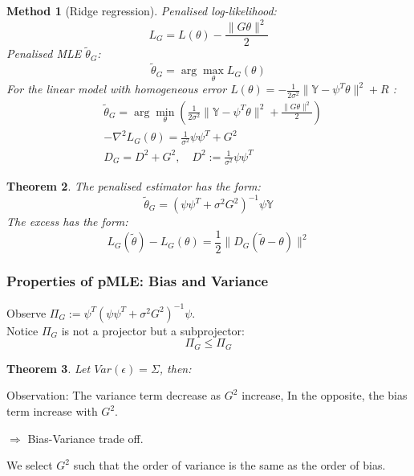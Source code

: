 \documentclass[a4paper,12pt, oneside, fleqn]{book}
\newtheorem{theorem}{Theorem}[section]
\newtheorem{method}[theorem]{Method}
\theoremstyle{definition}
\theoremstyle{remark}
\begin{document}
\begin{method}[Ridge regression]
Penalised log-likelihood:
\begin{equation*}
	L_G = L(\theta) - \frac{\|G\theta\|^2}{2} 
\end{equation*}
Penalised MLE $\tilde{\theta}_G$:
\begin{equation*}
	\tilde{\theta}_G = \arg \max_\theta L_G(\theta)
\end{equation*}	
For the linear model with homogeneous error $L(\theta) = -\frac{1}{2\sigma^2} \| \mathbb{Y} - \psi^T \theta\|^2 + R$ :
\begin{align*}
	&\tilde{\theta}_G = \arg \min_\theta(\frac{1}{2\sigma^2} \| \mathbb{Y} - \psi^T \theta\|^2 + \frac{\|G\theta\|^2}{2} )\\
	&-\nabla^2 L_G(\theta) = \frac{1}{\sigma^2} \psi \psi^T + G^2\\
	&D_G = D^2 + G^2, \quad D^2 := \frac{1}{\sigma^2} \psi \psi^T
\end{align*}
\end{method}



\begin{theorem}
	The penalised estimator has the form:
	\begin{equation*}
		\tilde{\theta}_G = (\psi \psi^T + \sigma^2 G^2)^{-1} \psi \mathbb{Y}
	\end{equation*}
	The excess has the form:
	\begin{equation*}
		L_G(\tilde{\theta}) - L_G(\theta) = \frac{1}{2} \|D_G(\tilde{\theta} - \theta) \|^2
	\end{equation*}
\end{theorem}


\subsubsection*{Properties of pMLE: Bias and Variance}
Observe $\Pi_G := \psi^T (\psi \psi^T + \sigma^2 G^2)^{-1} \psi$. \\
Notice $\Pi_G$ is not a projector but a subprojector:
\begin{equation*}
	\Pi_G \leq \Pi_G
\end{equation*}

\begin{theorem}
	Let $Var(\epsilon) = \Sigma$, then:
	
\end{theorem}

Observation:
The variance term decrease as $G^2$ increase, In the opposite, the bias term increase with $G^2$.\par
$\Rightarrow$ Bias-Variance trade off.\par 
We select $G^2$ such that the order of variance is the same as the order of bias.
\end{document}
